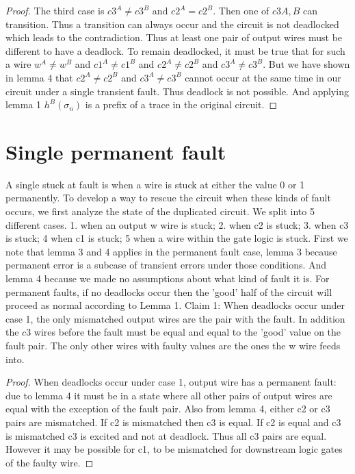 \documentclass{article}
\begin{document}
\begin{proof}
The third case is  $c3^A\neq c3^B$ and $c2^A=c2^B$.  Then one of $c3{A,B}$ can transition.\newline
Thus a transition can always occur and the circuit is not deadlocked which leads to the contradiction.  Thus at least one pair of output wires must be different to have a deadlock. To remain deadlocked, it must be true that for such a wire $w^A\neq w^B$ and $c1^A\neq c1^B$ and $c2^A\neq c2^B$ and $c3^A\neq c3^B$.  But we have shown in lemma 4 that $c2^A\neq c2^B$ and $c3^A\neq c3^B$ cannot occur at the same time in our circuit under a single transient fault. Thus deadlock is not possible.  And applying lemma 1 $h^B(\sigma_n)$ is a prefix of a trace in the original circuit. 
\end{proof}

\section{Single permanent fault}
A single stuck at fault is when a wire is stuck at either the value 0 or 1 permanently.  To develop a way to rescue the circuit when these kinds of fault occurs, we first analyze the state of the duplicated circuit.  We split into 5 different cases.  1. when an output w wire is stuck; 2. when c2 is stuck; 3. when c3 is stuck; 4 when c1 is stuck; 5 when a wire within the gate logic is stuck.  First we note that lemma 3 and 4 applies in the permanent fault case, lemma 3 because permanent error is a subcase of transient errors under those conditions.  And lemma 4 because we made no assumptions about what kind of fault it is.  For permanent faults, if no deadlocks occur then the 'good' half of the circuit will proceed as normal according to Lemma 1.  \newline
Claim 1: When deadlocks occur under case 1, the only mismatched output wires are the pair with the fault.  In addition the $c3$ wires before the fault must be equal and equal to the 'good' value on the fault pair.  The only other wires with faulty values are the ones the w wire feeds into.
\begin{proof}
When deadlocks occur under case 1, output wire has a permanent fault: due to lemma 4 it must be in a state where all other pairs of output wires are equal with the exception of the fault pair.  Also from lemma 4, either c2 or c3 pairs are mismatched.  If c2 is mismatched then c3 is equal. If c2 is equal and c3 is mismatched c3 is excited and not at deadlock.  Thus all c3 pairs are equal.   However it may be possible for c1, to be mismatched for downstream logic gates of the faulty wire.
\end{proof}
\end{document}
